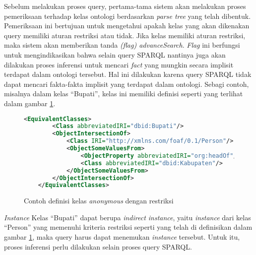 Sebelum melakukan proses query, pertama-tama sistem akan melakukan proses pemeriksaan terhadap kelas ontologi berdasarkan \emph{parse tree} yang telah dibentuk. Pemeriksaan ini bertujuan untuk mengetahui apakah kelas yang akan dikenakan query memiliki aturan restriksi atau tidak. Jika kelas memiliki aturan restriksi, maka sistem akan memberikan tanda \emph{(flag) advanceSearch}. \emph{Flag} ini berfungsi untuk mengindikasikan bahwa selain query SPARQL nantinya juga akan dilakukan proses inferensi untuk mencari \emph{fact} yang mungkin secara implisit terdapat dalam ontologi tersebut. Hal ini dilakukan karena query SPARQL tidak dapat mencari fakta-fakta implisit yang terdapat dalam ontologi. Sebagi contoh, misalnya dalam kelas ``Bupati'', kelas ini memiliki definisi seperti yang terlihat dalam gambar \ref{fig:definisi_kelas_bupati}.

\begin{figure}[t]
    \centering
    \begin{lstlisting}[language=XML,xleftmargin=0pt]
    <EquivalentClasses>
        <Class abbreviatedIRI="dbid:Bupati"/>
        <ObjectIntersectionOf>
            <Class IRI="http://xmlns.com/foaf/0.1/Person"/>
            <ObjectSomeValuesFrom>
                <ObjectProperty abbreviatedIRI="org:headOf"/>
                <Class abbreviatedIRI="dbid:Kabupaten"/>
            </ObjectSomeValuesFrom>
        </ObjectIntersectionOf>
    </EquivalentClasses>\end{lstlisting}
    \caption{Contoh definisi kelas \emph{anonymous} dengan restriksi}
    \label{fig:definisi_kelas_bupati}
\end{figure}

\emph{Instance} Kelas ``Bupati'' dapat berupa \emph{indirect instance}, yaitu \emph{instance} dari kelas ``Person'' yang memenuhi kriteria restriksi seperti yang telah di definisikan dalam gambar \ref{fig:definisi_kelas_bupati}, maka query harus dapat menemukan \emph{instance} tersebut. Untuk itu, proses inferensi perlu dilakukan selain proses query SPARQL.





